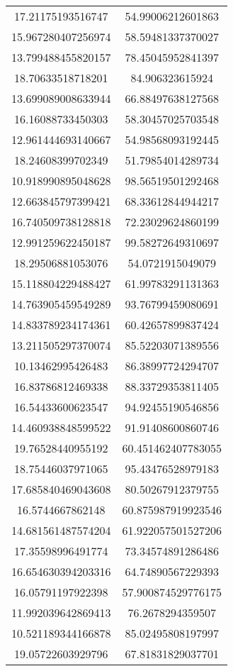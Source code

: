 \begin{table}
\begin{tabular}{cc}
17.21175193516747 & 54.99006212601863 \\
15.967280407256974 & 58.59481337370027 \\
13.799488455820157 & 78.45045952841397 \\
18.70633518718201 & 84.906323615924 \\
13.699089008633944 & 66.88497638127568 \\
16.16088733450303 & 58.30457025703548 \\
12.961444693140667 & 54.98568093192445 \\
18.24608399702349 & 51.79854014289734 \\
10.918990895048628 & 98.56519501292468 \\
12.663845797399421 & 68.33612844944217 \\
16.740509738128818 & 72.23029624860199 \\
12.991259622450187 & 99.58272649310697 \\
18.29506881053076 & 54.0721915049079 \\
15.118804229488427 & 61.99783291131363 \\
14.763905459549289 & 93.76799459080691 \\
14.833789234174361 & 60.42657899837424 \\
13.211505297370074 & 85.52203071389556 \\
10.13462995426483 & 86.38997724294707 \\
16.83786812469338 & 88.33729353811405 \\
16.54433600623547 & 94.92455190546856 \\
14.460938848599522 & 91.91408600860746 \\
19.76528440955192 & 60.451462407783055 \\
18.75446037971065 & 95.43476528979183 \\
17.685840469043608 & 80.50267912379755 \\
16.5744667862148 & 60.875987919923546 \\
14.681561487574204 & 61.922057501527206 \\
17.35598996491774 & 73.34574891286486 \\
16.654630394203316 & 64.74890567229393 \\
16.05791197922398 & 57.900874529776175 \\
11.992039642869413 & 76.2678294359507 \\
10.521189344166878 & 85.02495808197997 \\
19.05722603929796 & 67.81831829037701 \\

\end{tabular}
\end{table}
